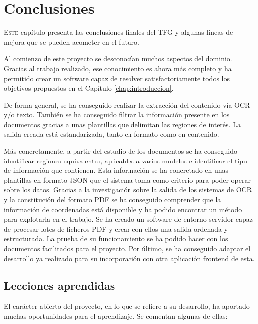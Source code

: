 
\chapter{Conclusiones}
\label{chap:conclusiones}

\lettrine{E}{ste} capítulo presenta las conclusiones finales del TFG y algunas líneas de mejora que se pueden acometer en el futuro.

Al comienzo de este proyecto se desconocían muchos aspectos del dominio. Gracias al trabajo realizado, ese conocimiento es ahora más completo y ha permitido crear un software capaz de resolver satisfactoriamente todos los objetivos propuestos en el Capítulo \ref{chap:introduccion}.

De forma general, se ha conseguido realizar la extracción del contenido vía OCR y/o texto. También se ha conseguido filtrar la información presente en los documentos gracias a unas plantillas que delimitan las regiones de interés. La salida creada está estandarizada, tanto en formato como en contenido.

Más concretamente, a partir del estudio de los documentos se ha conseguido identificar regiones equivalentes, aplicables a varios modelos e identificar el tipo de información que contienen.
Esta información se ha concretado en unas plantillas en formato JSON que el sistema toma como criterio para poder operar sobre los datos.
Gracias a la investigación sobre la salida de los sistemas de OCR y la constitución del formato PDF se ha conseguido comprender que la información de coordenadas está disponible y ha podido encontrar un método para explotarla en el trabajo. Se ha creado un software de entorno servidor capaz de procesar lotes de ficheros PDF y crear con ellos una salida ordenada y estructurada. La prueba de su funcionamiento se ha podido hacer con los documentos facilitados para el proyecto. Por último, se ha conseguido adaptar el desarrollo ya realizado para su incorporación con otra aplicación frontend de esta.

\section{Lecciones aprendidas}

El carácter abierto del proyecto, en lo que se refiere a su desarrollo, ha aportado muchas oportunidades para el aprendizaje. Se comentan algunas de ellas:

